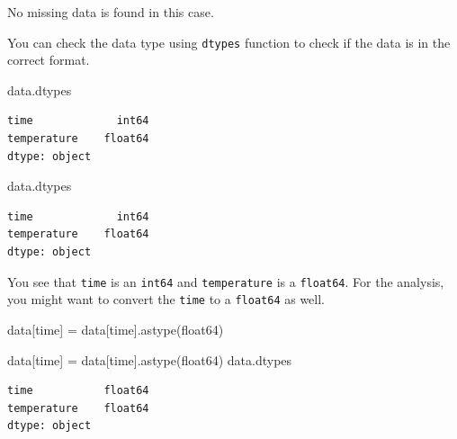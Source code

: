 \documentclass[
  letterpaper,
  DIV=11,
  numbers=noendperiod]{scrreprt}
\newenvironment{Shaded}{\begin{snugshade}}{\end{snugshade}}
\newcommand{\NormalTok}[1]{\textcolor[rgb]{0.00,0.23,0.31}{#1}}
\newcommand{\OperatorTok}[1]{\textcolor[rgb]{0.37,0.37,0.37}{#1}}
\newcommand{\StringTok}[1]{\textcolor[rgb]{0.13,0.47,0.30}{#1}}
\begin{document}
No missing data is found in this case.

You can check the data type using \texttt{dtypes} function to check if
the data is in the correct format.

\begin{Shaded}
\begin{Highlighting}[]
\NormalTok{data.dtypes}
\end{Highlighting}
\end{Shaded}

\begin{verbatim}
time             int64
temperature    float64
dtype: object
\end{verbatim}

\begin{Shaded}
\begin{Highlighting}[]
\NormalTok{data.dtypes}
\end{Highlighting}
\end{Shaded}

\begin{verbatim}
time             int64
temperature    float64
dtype: object
\end{verbatim}

You see that \texttt{time} is an \texttt{int64} and \texttt{temperature}
is a \texttt{float64}. For the analysis, you might want to convert the
\texttt{time} to a \texttt{float64} as well.

\begin{Shaded}
\begin{Highlighting}[]
\NormalTok{data[}\StringTok{\textquotesingle{}time\textquotesingle{}}\NormalTok{] }\OperatorTok{=}\NormalTok{ data[}\StringTok{\textquotesingle{}time\textquotesingle{}}\NormalTok{].astype(}\StringTok{\textquotesingle{}float64\textquotesingle{}}\NormalTok{)}
\end{Highlighting}
\end{Shaded}

\begin{Shaded}
\begin{Highlighting}[]
\NormalTok{data[}\StringTok{\textquotesingle{}time\textquotesingle{}}\NormalTok{] }\OperatorTok{=}\NormalTok{ data[}\StringTok{\textquotesingle{}time\textquotesingle{}}\NormalTok{].astype(}\StringTok{\textquotesingle{}float64\textquotesingle{}}\NormalTok{)}
\NormalTok{data.dtypes}
\end{Highlighting}
\end{Shaded}

\begin{verbatim}
time           float64
temperature    float64
dtype: object
\end{verbatim}
\end{document}
